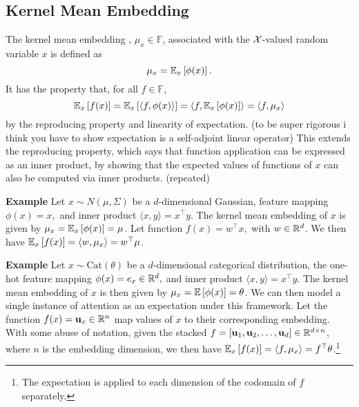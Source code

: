 \documentclass{article}
\begin{document}
\subsection{Kernel Mean Embedding}
The kernel mean embedding \citep{smola2007}, $\mu_x\in\mathbb{F}$,
associated with the $\mathcal{X}$-valued random variable $x$
is defined as
\begin{equation}
\label{eqn:kme}
\mu_x = \mathbb{E}_{x}\left[\phi(x)\right].
\end{equation}
It has the property that, for all $f \in \mathbb{F}$,
\begin{equation}
\label{eqn:expectation-inner-product}
\mathbb{E}_{x}\left[f(x)\right]
= \mathbb{E}_{x}\left[\langle f, \phi(x)\rangle\right]
= \langle f, \mathbb{E}_{x}\left[\phi(x)\right]\rangle
= \langle f, \mu_x \rangle
\end{equation}
by the reproducing property and linearity of expectation.
(to be super rigorous i think you have to show expectation is a self-adjoint linear operator)
This extends the reproducing property,
which says that function application can be expressed as an inner product,
by showing that the expected values of functions of $x$ can also
be computed via inner products. (repeated)

\textbf{Example}
Let $x\sim N(\mu, \Sigma)$ be a $d$-dimensional Gaussian,
feature mapping $\phi(x) = x,$
and inner product $\langle x, y\rangle = x^\top y$.
The kernel mean embedding of $x$ is given by $\mu_x = \mathbb{E}_{x}\left[\phi(x)\right] = \mu$.
Let function $f(x) = w^\top x,$ with $w\in\mathbb{R}^d$.
We then have $\mathbb{E}_{x}\left[f(x)\right] = \langle w, \mu_x \rangle = w^\top \mu$.

\textbf{Example}
Let $x\sim \textrm{Cat}(\theta)$ be a $d$-dimensional categorical distribution,
the one-hot feature mapping $\phi(x) = e_x\in\mathbb{R}^d,$
and inner product $\langle x, y\rangle = x^\top y$.
The kernel mean embedding of $x$ is then given by $\mu_x = \mathbb{E}\left[\phi(x)\right] = \theta$.
We can then model a single instance of attention as an expectation under this framework.
Let the function $f(x) = \mathbf{u}_x\in\mathbb{R}^n$ map values of $x$ to their corresponding embedding.
With some abuse of notation,
given the stacked $f = [\mathbf{u}_1, \mathbf{u}_2, \ldots, \mathbf{u}_d] \in \mathbb{R}^{d\times n}$,
where $n$ is the embedding dimension,
we then have
$\mathbb{E}_{x}\left[f(x)\right] = \langle f, \mu_x\rangle = f^\top\theta$.\footnote{
The expectation is applied to each dimension of the codomain of $f$ separately.
}
\end{document}
